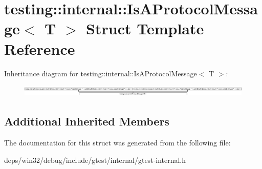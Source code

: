 \hypertarget{structtesting_1_1internal_1_1_is_a_protocol_message}{}\section{testing\+:\+:internal\+:\+:Is\+A\+Protocol\+Message$<$ T $>$ Struct Template Reference}
\label{structtesting_1_1internal_1_1_is_a_protocol_message}
Inheritance diagram for testing\+:\+:internal\+:\+:Is\+A\+Protocol\+Message$<$ T $>$\+:\begin{figure}[H]
\begin{center}
\leavevmode
\includegraphics[height=0.566229cm]{structtesting_1_1internal_1_1_is_a_protocol_message}
\end{center}
\end{figure}
\subsection*{Additional Inherited Members}


The documentation for this struct was generated from the following file\+:\begin{DoxyCompactItemize}
\item 
deps/win32/debug/include/gtest/internal/gtest-\/internal.\+h\end{DoxyCompactItemize}

